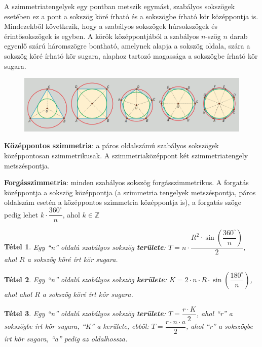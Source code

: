 \documentclass[12pt,a4paper]{article}
\newtheorem{theorem}{Tétel} [section]
\begin{document}
A szimmetriatengelyek egy pontban metszik egymást, szabályos sokszögek esetében ez a pont a sokszög köré írható és a sokszögbe írható kör középpontja is. Mindezekből következik, hogy a szabályos sokszögek húrsokszögek és érintősokszögek is egyben. A körök középpontjából a szabályos $n$-szög $n$ darab egyenlő szárú háromszögre bontható, amelynek alapja a sokszög oldala, szára a sokszög köré írható kör sugara, alaphoz tartozó magassága a sokszögbe írható kör sugara.

\begin{figure}[h]
\centering
\includegraphics[scale=0.3]{geometry/szimmetria3}
\end{figure}

\textbf{Középpontos szimmetria}: a páros oldalszámú szabályos sokszögek középpontosan szimmetrikusak. A szimmetriaközéppont két szimmetriatengely metszéspontja.

\textbf{Forgásszimmetria}: minden szabályos sokszög forgásszimmetrikus. A forgatás középpontja a sokszög középpontja (a szimmetria tengelyek metszéspontja, páros oldalszám esetén a középpontos szimmetria középpontja is), a forgatás szöge pedig lehet $k\cdot \dfrac{360^\circ}{n}$, ahol $k\in \mathbb{Z}$
\newpage
\begin{theorem}
Egy ``n'' oldalú szabályos sokszög \textbf{területe}: $T=n\cdot \dfrac{R^2\cdot \sin \left(\dfrac{360^\circ}{n} \right)}{2}$, ahol $R$ a sokszög köré írt kör sugara.
\end{theorem}

\begin{theorem}
Egy ``n'' oldalú szabályos sokszög \textbf{kerülete}: $K=2\cdot n \cdot R \cdot \sin \left(\dfrac{180^\circ}{n} \right)$, ahol ahol $R$ a sokszög köré írt kör sugara.
\end{theorem}

\begin{theorem}
Egy ``n'' oldalú szabályos sokszög \textbf{területe}: $T=\dfrac{r\cdot K}{2}$, ahol  ``r'' a sokszögbe írt kör sugara, ``K'' a kerülete, ebből: $T=\dfrac{r\cdot n \cdot a}{2}$, ahol ``r'' a sokszögbe írt kör sugara, ``a'' pedig az oldalhossza.
\end{theorem}
\end{document}
